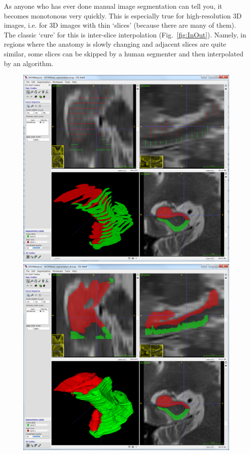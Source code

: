 \documentclass{InsightArticle}
\begin{document}
As anyone who has ever done manual image segmentation can tell you,
it becomes monotonous very quickly.
This is especially true for high-resolution 3D images,
i.e. for 3D images with thin `slices' (because there are many of them).
The classic `cure' for this is inter-slice interpolation (Fig.~\ref{fig:InOut}).
Namely, in regions where the anatomy is slowly changing and adjacent slices are quite similar,
some slices can be skipped by a human segmenter and then interpolated by an algorithm.

\begin{figure}[htb]
\center
\includegraphics[scale=0.265]{In1.png}
\includegraphics[scale=0.265]{Out1.png}

\end{figure}
\end{document}
